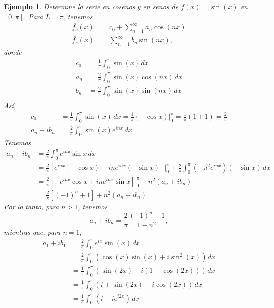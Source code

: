 \documentclass[11pt,letterpaper]{report}
\newtheorem{example}[defn]{Ejemplo}
\newcommand\<{\langle}
\renewcommand\>{\rangle}
\begin{document}
\begin{example}
  Determine la serie en cosenos y en senos de $f(x)=\sin(x)$ en
  $[0,\pi]$.
  Para $L=\pi$, tenemos
  \begin{align*}
    \overline{f_c}(x)
    &=
    c_0
    +
    \sum_{n=1}^{\infty}a_n\cos(nx) \\
    \overline{f_s}(x)
    &= \sum_{n=1}^{\infty}b_n\sin(nx),
  \end{align*}
  donde
  \begin{align*}
    c_0
    &= \frac{1}{\pi}\int_{0}^{\pi}\sin(x)\,dx \\
    a_n
    &= \frac{2}{\pi}\int_{0}^{\pi}\sin(x)\cos(n x)\,dx \\
    b_n
    &= \frac{2}{\pi}\int_{0}^{\pi}\sin(x)\sin(n x)\,dx \\
  \end{align*}
  Así,
  \begin{align*}
    c_0
    &=
    \frac{1}{\pi}\int_{0}^{\pi}\sin(x)\,dx
    =\frac{1}{\pi}(-\cos x)\Big|_{0}^{\pi}
    =\frac{1}{\pi}(1+1)
    =\frac{2}{\pi} \\
    a_n+ib_n
    &= \frac{2}{\pi}\int_{0}^{\pi}\sin(x)e^{inx}\,dx
  \end{align*}
  Tenemos
  \begin{align*}
    a_n+ib_n
    &= \frac{2}{\pi}\int_{0}^{\pi}e^{inx}\sin x \,dx \\
    &= \frac{2}{\pi} \left[
      e^{inx}(-\cos x)
      -ine^{inx}(-\sin x)
    \right]\Big|_{0}^{\pi}
    +\frac{2}{\pi}\int_{0}^{\pi}(-n^{2}e^{inx})(-\sin x)\,dx \\
    &= \frac{2}{\pi} \left[
      -e^{inx}\cos x
      +ine^{inx}\sin x
    \right]\Big|_{0}^{\pi}
    +n^{2}(a_n+ib_n) \\
    &= \frac{2}{\pi} \left[
      (-1)^{n}
      +1
    \right]
    +n^{2}(a_n+ib_n)
  \end{align*}
  Por lo tanto, para $n>1$, tenemos
  \[
    a_n+ib_n
    =
    \frac{2}{\pi}\frac{(-1)^{n}+1}{1-n^{2}}
  ,\]
  mientras que, para $n=1$,
  \begin{align*}
    a_1+ib_1
    &=\frac{2}{\pi}\int_{0}^{\pi}e^{ix}\sin(x)\,dx \\
    &=\frac{2}{\pi}\int_{0}^{\pi}(\cos(x)\sin(x)+i\sin^{2}(x))\,dx \\
    &=\frac{1}{\pi}\int_{0}^{\pi}(\sin(2x)+i(1-\cos(2x)))\,dx \\
    &=\frac{1}{\pi}\int_{0}^{\pi}(i+\sin(2x)-i\cos(2x))\,dx \\
    &=\frac{1}{\pi}\int_{0}^{\pi}(i-ie^{i2x})\,dx \\

\end{align*}
\end{example}
\end{document}
